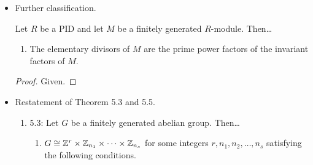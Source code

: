 \documentclass[../notes.tex]{subfiles}
\begin{document}
\begin{itemize}
\begin{lemma}
\begin{enumerate}[ref={\thelemma(\arabic*)}]
        \end{enumerate}
        \begin{proof}
            Given.
        \end{proof}
    \end{lemma}
    \begin{theorem}\label{trm:12.9}
        Let $R$ be a PID.
        \begin{enumerate}[ref={\thetheorem(\arabic*)}]
            \item \label{lem:12.9.1}Two finitely generated $R$-modules $M_1$ and $M_2$ are isomorphic iff they have the same free rank and the same list of invariant factors.
            \item \label{lem:12.9.2}Two finitely generated $R$-modules $M_1$ and $M_2$ are isomorphic iff they have the same free rank and the same list of invariant factors.
        \end{enumerate}
        \begin{proof}
            Given.
        \end{proof}
    \end{theorem}
    \item Further classification.
    \begin{corollary}\label{cly:12.10}
        Let $R$ be a PID and let $M$ be a finitely generated $R$-module. Then\dots
        \begin{enumerate}
            \item The elementary divisors of $M$ are the prime power factors of the invariant factors of $M$.
        \end{enumerate}
        \begin{proof}
            Given.
        \end{proof}
    \end{corollary}
    \item Restatement of Theorem 5.3 and 5.5.
    \begin{corollary}\label{cly:12.11}\leavevmode
        \begin{enumerate}
            \item 5.3: Let $G$ be a finitely generated abelian group. Then\dots
            \begin{enumerate}
                \item $G\cong\mathbb{Z}^r\times\mathbb{Z}_{n_1}\times\cdots\times\mathbb{Z}_{n_s}$ for some integers $r,n_1,n_2,\dots,n_s$ satisfying the following conditions.
                \begin{enumerate}[label={(\roman*)}]

\end{enumerate}
\end{enumerate}
\end{enumerate}
\end{corollary}
\end{itemize}
\end{document}
